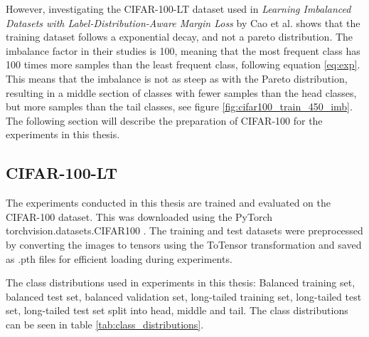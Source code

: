 

However, investigating the CIFAR-100-LT dataset used in \emph{Learning Imbalanced Datasets with Label-Distribution-Aware Margin Loss} by Cao et al. \cite{cao2019learningimbalanceddatasetslabeldistributionaware} shows that the training dataset follows a exponential decay, and not a pareto distribution. The imbalance factor in their studies is 100, meaning that the most frequent class has 100 times more samples than the least frequent class, following equation \eqref{eq:exp}. This means that the imbalance is not as steep as with the Pareto distribution, resulting in a middle section of classes with fewer samples than the head classes, but more samples than the tail classes, see figure \ref{fig:cifar100_train_450_imb}. The following section will describe the preparation of CIFAR-100 for the experiments in this thesis.


\subsection{CIFAR-100-LT}
The experiments conducted in this thesis are trained and evaluated on the CIFAR-100 dataset. This was downloaded using the PyTorch torchvision.datasets.CIFAR100 \cite{pytorch_cifar100}. The training and test datasets were preprocessed by converting the images to tensors using the ToTensor transformation and saved as .pth files for efficient loading during experiments. 

The class distributions used in experiments in this thesis: Balanced training set, balanced test set, balanced validation set, long-tailed training set, long-tailed test set, long-tailed test set split into head, middle and tail. The class distributions can be seen in table \ref{tab:class_distributions}.

